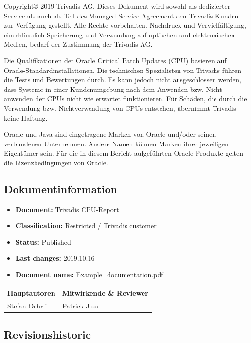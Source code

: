 Copyright© 2019 Trivadis AG. Dieses Dokument wird sowohl als dedizierter
Service als auch als Teil des Managed Service Agreement den Trivadis
Kunden zur Verfügung gestellt. Alle Rechte vorbehalten. Nachdruck und
Vervielfältigung, einschliesslich Speicherung und Verwendung auf
optischen und elektronischen Medien, bedarf der Zustimmung der Trivadis
AG.

Die Qualifikationen der Oracle Critical Patch Updates (CPU) basieren auf
Oracle-Standardinstallationen. Die technischen Spezialisten von Trivadis
führen die Tests und Bewertungen durch. Es kann jedoch nicht
ausgeschlossen werden, dass Systeme in einer Kundenumgebung nach dem
Anwenden bzw. Nicht-anwenden der CPUs nicht wie erwartet funktionieren.
Für Schäden, die durch die Verwendung bzw. Nichtverwendung von CPUs
entstehen, übernimmt Trivadis keine Haftung.

Oracle und Java sind eingetragene Marken von Oracle und/oder seinen
verbundenen Unternehmen. Andere Namen können Marken ihrer jeweiligen
Eigentümer sein. Für die in diesem Bericht aufgeführten Oracle-Produkte
gelten die Lizenzbedingungen von Oracle.

\hypertarget{dokumentinformation}{%
\subsection{Dokumentinformation}\label{dokumentinformation}}

\begin{itemize}
\tightlist
\item
  \textbf{Document:} Trivadis CPU-Report
\item
  \textbf{Classification:} Restricted / Trivadis customer
\item
  \textbf{Status:} Published
\item
  \textbf{Last changes:} 2019.10.16
\item
  \textbf{Document name:} Example\_documentation.pdf
\end{itemize}

\begin{longtable}[]{@{}ll@{}}
\toprule
Hauptautoren & Mitwirkende \& Reviewer\tabularnewline
\midrule
\endhead
Stefan Oehrli & Patrick Joss\tabularnewline
\bottomrule
\end{longtable}

\hypertarget{revisionshistorie}{%
\subsection{Revisionshistorie}\label{revisionshistorie}}

